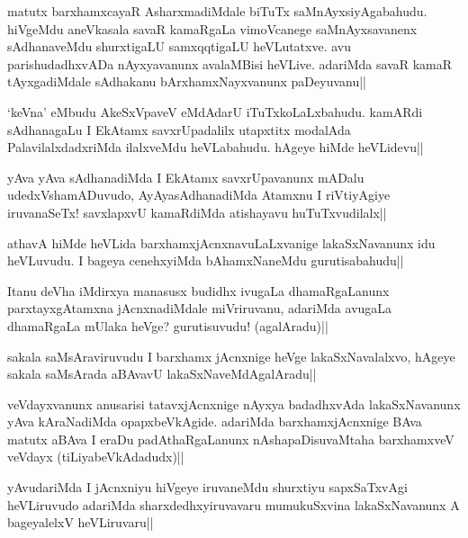 \begin{artha}%
matutx barxhamxcayaR AsharxmadiMdale biTuTx saMnAyxsiyAgabahudu. hiVgeMdu aneVkasala savaR kamaRgaLa vimoVcanege saMnAyxsavanenx sAdhanaveMdu shurxtigaLU samxqqtigaLU heVLutatxve. avu parishudadhxvADa nAyxyavanunx avalaMBisi heVLive. adariMda savaR kamaR tAyxgadiMdale sAdhakanu bArxhamxNayxvanunx paDeyuvanu||
\end{artha}

\begin{artha}
`keVna' eMbudu AkeSxVpaveV eMdAdarU iTuTxkoLaLxbahudu. kamARdi sAdhanagaLu I EkAtamx savxrUpadalilx utapxtitx modalAda PalavilalxdadxriMda ilalxveMdu heVLabahudu. hAgeye hiMde heVLidevu||
\end{artha}


\begin{artha}
yAva yAva sAdhanadiMda I EkAtamx savxrUpavanunx mADalu udedxVshamADuvudo, AyAyasAdhanadiMda Atamxnu I riVtiyAgiye iruvanaSeTx! savxlapxvU kamaRdiMda atishayavu huTuTxvudilalx||
\end{artha}

\begin{artha}%
athavA hiMde heVLida barxhamxjAcnxnavuLaLxvanige lakaSxNavanunx idu heVLuvudu. I bageya cenehxyiMda bAhamxNaneMdu gurutisabahudu||
\end{artha}

\begin{artha}
Itanu deVha iMdirxya manasusx budidhx ivugaLa dhamaRgaLanunx parxtayxgAtamxna jAcnxnadiMdale miVriruvanu, adariMda avugaLa dhamaRgaLa mUlaka heVge? gurutisuvudu! (agalAradu)||
\end{artha}

\begin{artha}
sakala saMsAraviruvudu I barxhamx jAcnxnige heVge lakaSxNavalalxvo, hAgeye sakala saMsArada aBAvavU lakaSxNaveMdAgalAradu||
\end{artha}


\begin{artha}
veVdayxvanunx anusarisi tatavxjAcnxnige nAyxya badadhxvAda lakaSxNavanunx yAva kAraNadiMda opapxbeVkAgide. adariMda barxhamxjAcnxnige BAva matutx aBAva I eraDu padAthaRgaLanunx nAshapaDisuvaMtaha barxhamxveV veVdayx (tiLiyabeVkAdadudx)||
\end{artha}

\begin{artha}
yAvudariMda I jAcnxniyu hiVgeye iruvaneMdu shurxtiyu sapxSaTxvAgi heVLiruvudo adariMda sharxdedhxyiruvavaru mumukuSxvina lakaSxNavanunx A bageyalelxV heVLiruvaru||
\end{artha}%

